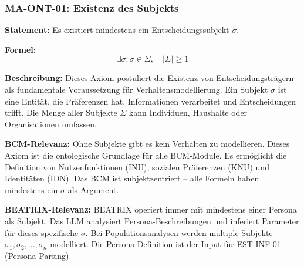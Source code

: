 



\subsubsection*{MA-ONT-01: Existenz des Subjekts}

\textbf{Statement:} Es existiert mindestens ein Entscheidungssubjekt $\sigma$.

\textbf{Formel:}
\begin{equation}
\exists \sigma: \sigma \in \Sigma, \quad |\Sigma| \geq 1
\end{equation}

\textbf{Beschreibung:}
Dieses Axiom postuliert die Existenz von Entscheidungsträgern als fundamentale Voraussetzung für Verhaltensmodellierung. Ein Subjekt $\sigma$ ist eine Entität, die Präferenzen hat, Informationen verarbeitet und Entscheidungen trifft. Die Menge aller Subjekte $\Sigma$ kann Individuen, Haushalte oder Organisationen umfassen.

\textbf{BCM-Relevanz:}
Ohne Subjekte gibt es kein Verhalten zu modellieren. Dieses Axiom ist die ontologische Grundlage für alle BCM-Module. Es ermöglicht die Definition von Nutzenfunktionen (INU), sozialen Präferenzen (KNU) und Identitäten (IDN). Das BCM ist subjektzentriert -- alle Formeln haben mindestens ein $\sigma$ als Argument.

\textbf{BEATRIX-Relevanz:}
BEATRIX operiert immer mit mindestens einer Persona als Subjekt. Das LLM analysiert Persona-Beschreibungen und inferiert Parameter für dieses spezifische $\sigma$. Bei Populationsanalysen werden multiple Subjekte $\sigma_1, \sigma_2, ..., \sigma_n$ modelliert. Die Persona-Definition ist der Input für EST-INF-01 (Persona Parsing).

